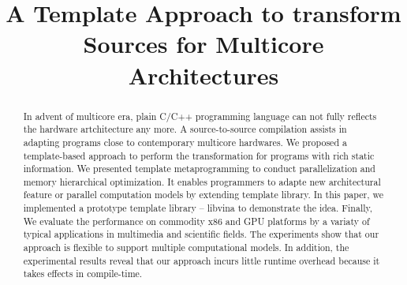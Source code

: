 \documentclass[10pt, conference, compsocconf]{IEEEtran}
\begin{document}
%
\title{A Template Approach to transform Sources for Multicore Architectures}





% 
\author{}








\maketitle


\begin{abstract}
In advent of multicore era, plain C/C++ programming language can not fully reflects the hardware artchitecture any more. A source-to-source compilation assists in adapting programs close to contemporary multicore hardwares. We proposed a template-based approach to perform the transformation for programs with rich static information. We presented template metaprogramming to conduct parallelization and memory hierarchical optimization. It enables programmers to adapte new architectural feature or parallel computation models by extending template library. 
In this paper, we implemented a prototype template library -- libvina to demonstrate the idea. Finally, We evaluate the performance on commodity x86 and GPU platforms by a variaty of typical applications in multimedia and scientific fields. The experiments show that our approach is flexible to support multiple computational models. In addition, the experimental results reveal that our approach incurs little runtime overhead because it takes effects in compile-time.
\end{abstract}
\end{document}
